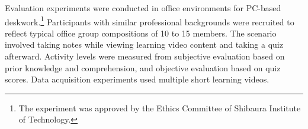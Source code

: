 %
Evaluation experiments were conducted in office environments for PC-based deskwork.\footnote{The experiment was approved by the Ethics Committee of Shibaura Institute of Technology.}
Participants with similar professional backgrounds were recruited to reflect typical office group compositions of 10 to 15 members.
The scenario involved taking notes while viewing learning video content and taking a quiz afterward.
Activity levels were measured from subjective evaluation based on prior knowledge and comprehension, and objective evaluation based on quiz scores.
Data acquisition experiments used multiple short learning videos.
